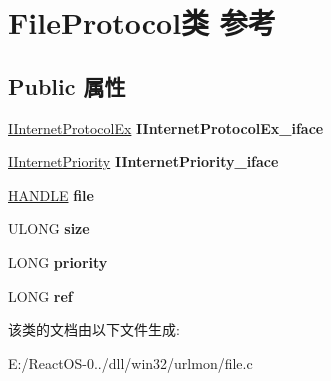 \hypertarget{struct_file_protocol}{}\section{File\+Protocol类 参考}
\label{struct_file_protocol}
\subsection*{Public 属性}
\begin{DoxyCompactItemize}
\item 
\mbox{\label{struct_file_protocol_aa9cbc098ecb93de08b8b93b4eafa650c}} 
\hyperlink{interface_i_internet_protocol_ex}{I\+Internet\+Protocol\+Ex} {\bfseries I\+Internet\+Protocol\+Ex\+\_\+iface}
\item 
\mbox{\label{struct_file_protocol_a881d4d8bdb1218650949c7dae439ed3a}} 
\hyperlink{interface_i_internet_priority}{I\+Internet\+Priority} {\bfseries I\+Internet\+Priority\+\_\+iface}
\item 
\mbox{\label{struct_file_protocol_a545699ee8dfa046a13e79d43aec2d5eb}} 
\hyperlink{interfacevoid}{H\+A\+N\+D\+LE} {\bfseries file}
\item 
\mbox{\label{struct_file_protocol_a93c53698c6dee6b0d5e8b2c2be9dd57b}} 
U\+L\+O\+NG {\bfseries size}
\item 
\mbox{\label{struct_file_protocol_a039c5c98b9e6970c058717c5758ab6a8}} 
L\+O\+NG {\bfseries priority}
\item 
\mbox{\label{struct_file_protocol_ad5e6f59fe42f6f1534187271212428c7}} 
L\+O\+NG {\bfseries ref}
\end{DoxyCompactItemize}


该类的文档由以下文件生成\+:\begin{DoxyCompactItemize}
\item 
E\+:/\+React\+O\+S-\/0../dll/win32/urlmon/file.\+c\end{DoxyCompactItemize}
